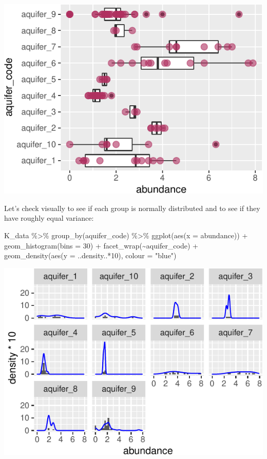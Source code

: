\documentclass[
]{krantz}
\newenvironment{Shaded}{\begin{snugshade}}{\end{snugshade}}
\newcommand{\AttributeTok}[1]{\textcolor[rgb]{0.77,0.63,0.00}{#1}}
\newcommand{\DecValTok}[1]{\textcolor[rgb]{0.00,0.00,0.81}{#1}}
\newcommand{\FunctionTok}[1]{\textcolor[rgb]{0.00,0.00,0.00}{#1}}
\newcommand{\NormalTok}[1]{#1}
\newcommand{\SpecialCharTok}[1]{\textcolor[rgb]{0.00,0.00,0.00}{#1}}
\newcommand{\StringTok}[1]{\textcolor[rgb]{0.31,0.60,0.02}{#1}}
\begin{document}
\begin{center}\includegraphics[width=0.8\linewidth]{index_files/figure-latex/unnamed-chunk-143-1} \end{center}

Let's check visually to see if each group is normally distributed and to see if they have roughly equal variance:

\begin{Shaded}
\begin{Highlighting}[]
\NormalTok{K\_data }\SpecialCharTok{\%\textgreater{}\%}
  \FunctionTok{group\_by}\NormalTok{(aquifer\_code) }\SpecialCharTok{\%\textgreater{}\%}
  \FunctionTok{ggplot}\NormalTok{(}\FunctionTok{aes}\NormalTok{(}\AttributeTok{x =}\NormalTok{ abundance)) }\SpecialCharTok{+} 
    \FunctionTok{geom\_histogram}\NormalTok{(}\AttributeTok{bins =} \DecValTok{30}\NormalTok{) }\SpecialCharTok{+}
    \FunctionTok{facet\_wrap}\NormalTok{(}\SpecialCharTok{\textasciitilde{}}\NormalTok{aquifer\_code) }\SpecialCharTok{+}
    \FunctionTok{geom\_density}\NormalTok{(}\FunctionTok{aes}\NormalTok{(}\AttributeTok{y =}\NormalTok{ ..density..}\SpecialCharTok{*}\DecValTok{10}\NormalTok{), }\AttributeTok{colour =} \StringTok{"blue"}\NormalTok{)}
\end{Highlighting}
\end{Shaded}

\begin{center}\includegraphics[width=0.8\linewidth]{index_files/figure-latex/unnamed-chunk-144-1} \end{center}
\end{document}
